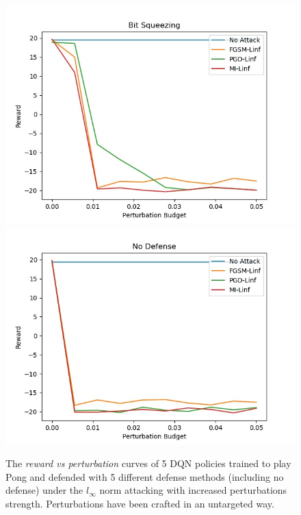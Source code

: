 \begin{figure}
    {\includegraphics[width=0.49\linewidth]{images/exp3/untargeted/Bit_Squeezing.jpg}}
    {\includegraphics[width=0.49\linewidth]{images/exp3/untargeted/No_Defense.jpg}}
  \caption{The {\it reward vs perturbation} curves of 5 DQN policies trained to play Pong and defended with 5 different defense methods (including no defense) under the \(l_\infty\) norm attacking with increased perturbations strength. Perturbations have been crafted in an untargeted way.}
  \label{figure:untargeted-rew}
\end{figure}

